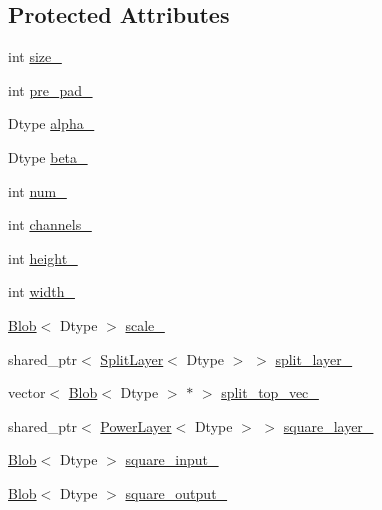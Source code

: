 \subsection*{Protected Attributes}
\begin{DoxyCompactItemize}
\item 
int \hyperlink{classcaffe_1_1_l_r_n_layer_a4d74c3370e28abe013bf0fcc815fcc17}{size\+\_\+}
\item 
int \hyperlink{classcaffe_1_1_l_r_n_layer_a5d4a63f1279542a4fbe2780ba061f800}{pre\+\_\+pad\+\_\+}
\item 
Dtype \hyperlink{classcaffe_1_1_l_r_n_layer_ae5a9eaf89e4082afe166f0fa7ee3b4ed}{alpha\+\_\+}
\item 
Dtype \hyperlink{classcaffe_1_1_l_r_n_layer_aa0765abb189bb6be067494ea5cc925f2}{beta\+\_\+}
\item 
int \hyperlink{classcaffe_1_1_l_r_n_layer_ac68d88464a09f9deaf929908ffbaf345}{num\+\_\+}
\item 
int \hyperlink{classcaffe_1_1_l_r_n_layer_acd1bc62c5c9074c1df80f12d716f9a7a}{channels\+\_\+}
\item 
int \hyperlink{classcaffe_1_1_l_r_n_layer_a9fa09286b061a99713b4268259fdaad7}{height\+\_\+}
\item 
int \hyperlink{classcaffe_1_1_l_r_n_layer_a5b12d5c779f16e9b1caf4c3a6d581e09}{width\+\_\+}
\item 
\hyperlink{classcaffe_1_1_blob}{Blob}$<$ Dtype $>$ \hyperlink{classcaffe_1_1_l_r_n_layer_a61a44943c15c502c557df755d8ef4c6c}{scale\+\_\+}
\item 
shared\+\_\+ptr$<$ \hyperlink{classcaffe_1_1_split_layer}{Split\+Layer}$<$ Dtype $>$ $>$ \hyperlink{classcaffe_1_1_l_r_n_layer_a7126b6cbb83ddafb80c9d9dc6d44f88f}{split\+\_\+layer\+\_\+}
\item 
vector$<$ \hyperlink{classcaffe_1_1_blob}{Blob}$<$ Dtype $>$ $\ast$ $>$ \hyperlink{classcaffe_1_1_l_r_n_layer_a9b199156b8113800365c64c22e0e177a}{split\+\_\+top\+\_\+vec\+\_\+}
\item 
shared\+\_\+ptr$<$ \hyperlink{classcaffe_1_1_power_layer}{Power\+Layer}$<$ Dtype $>$ $>$ \hyperlink{classcaffe_1_1_l_r_n_layer_a440a40fc6ec9131fd8425dabe8a48fa9}{square\+\_\+layer\+\_\+}
\item 
\hyperlink{classcaffe_1_1_blob}{Blob}$<$ Dtype $>$ \hyperlink{classcaffe_1_1_l_r_n_layer_a750c4b6871af300f8de03b5eda197056}{square\+\_\+input\+\_\+}
\item 
\hyperlink{classcaffe_1_1_blob}{Blob}$<$ Dtype $>$ \hyperlink{classcaffe_1_1_l_r_n_layer_a50c1f72f225f69d344857fc55dc52ef9}{square\+\_\+output\+\_\+}

\end{DoxyCompactItemize}
